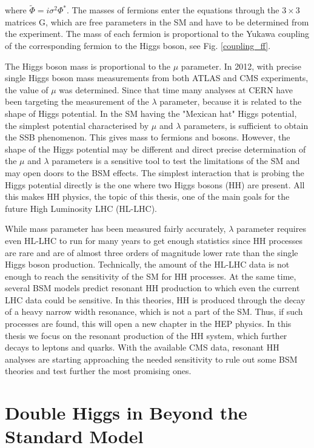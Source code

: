 \noindent where $\tilde{\Phi} = i \sigma^2 \Phi^*$. The masses of fermions enter the equations through the $3 \times 3$ matrices G, which are free parameters in the SM and have to be determined from the experiment. The mass of each fermion is proportional to the Yukawa coupling of the corresponding fermion to the Higgs boson, see Fig. \ref{coupling_ff}.


The Higgs boson mass is proportional to the $\mu$ parameter. In 2012, with precise single Higgs boson mass measurements from both ATLAS and CMS experiments, the value of $\mu$ was determined. Since that time many analyses at CERN have been targeting the measurement of the $\lambda$ parameter, because it is related to the shape of Higgs potential. In the SM having the "Mexican hat" Higgs potential, the simplest potential characterised by $\mu$ and $\lambda$ parameters, is sufficient to obtain the SSB phenomenon. This gives mass to fermions and bosons. However, the shape of the Higgs potential may be different and direct precise determination of the $\mu$ and $\lambda$ parameters is a sensitive tool to test the limitations of the SM and may open doors to the BSM effects. The simplest interaction that is probing the Higgs potential directly is the one where two Higgs bosons (HH) are present. All this makes HH physics, the topic of this thesis, one of the main goals for the future High Luminosity LHC (HL-LHC). 




While mass parameter has been measured fairly accurately, $\lambda$ parameter requires even HL-LHC to run for many years to get enough statistics since HH processes are rare and are of almost three orders of magnitude lower rate than the single Higgs boson production. Technically, the amount of the HL-LHC data is not enough to reach the sensitivity of the SM for HH processes. At the same time, several BSM models predict resonant HH production to which even the current LHC data could be sensitive. In this theories, HH is produced through the decay of a heavy narrow width resonance, which is not a part of the SM. Thus, if such processes are found, this will open a new chapter in the HEP physics. In this thesis we focus on the resonant production of the HH system, which further decays to leptons and quarks. With the available CMS data, resonant HH analyses are starting approaching the needed sensitivity to rule out some BSM theories and test further the most promising ones.

\section{Double Higgs in Beyond the Standard Model}

